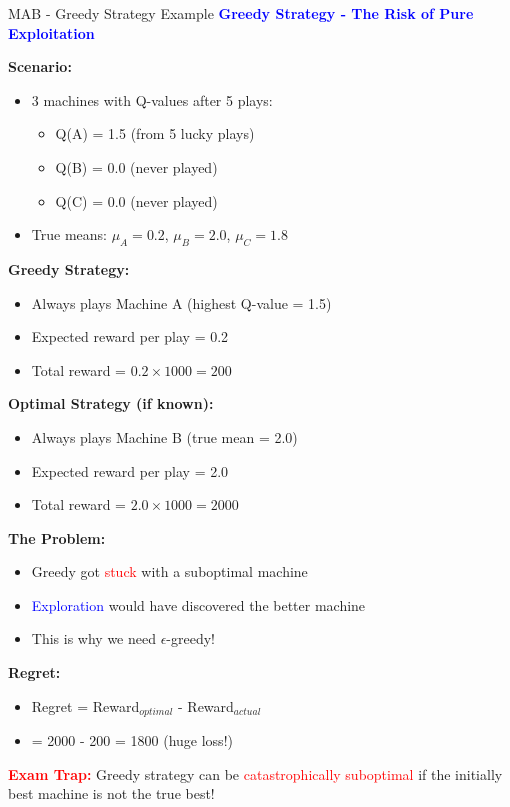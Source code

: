 \documentclass[8pt]{beamer}
\begin{document}
	\begin{frame}{MAB - Greedy Strategy Example}
		\fontsize{6.5}{7.5}\selectfont
		\textcolor{blue}{\textbf{Greedy Strategy - The Risk of Pure Exploitation}}
		
		\textbf{Scenario:}
		\begin{itemize}
			\item 3 machines with Q-values after 5 plays:
			\begin{itemize}
				\item Q(A) = 1.5 (from 5 lucky plays)
				\item Q(B) = 0.0 (never played)
				\item Q(C) = 0.0 (never played)
			\end{itemize}
			\item True means: $\mu_A = 0.2$, $\mu_B = 2.0$, $\mu_C = 1.8$
		\end{itemize}
		
		\textbf{Greedy Strategy:}
		\begin{itemize}
			\item Always plays Machine A (highest Q-value = 1.5)
			\item Expected reward per play = 0.2
			\item Total reward = $0.2 \times 1000 = 200$
		\end{itemize}
		
		\textbf{Optimal Strategy (if known):}
		\begin{itemize}
			\item Always plays Machine B (true mean = 2.0)
			\item Expected reward per play = 2.0
			\item Total reward = $2.0 \times 1000 = 2000$
		\end{itemize}
		
		\textbf{The Problem:}
		\begin{itemize}
			\item Greedy got \textcolor{red}{stuck} with a suboptimal machine
			\item \textcolor{blue}{Exploration} would have discovered the better machine
			\item This is why we need $\epsilon$-greedy!
		\end{itemize}
		
		\textbf{Regret:}
		\begin{itemize}
			\item Regret = Reward$_{optimal}$ - Reward$_{actual}$
			\item = 2000 - 200 = 1800 (huge loss!)
		\end{itemize}
		
		\textcolor{red}{\textbf{Exam Trap:}} Greedy strategy can be \textcolor{red}{catastrophically suboptimal} if the initially best machine is not the true best!
	\end{frame}
	
\end{document}
